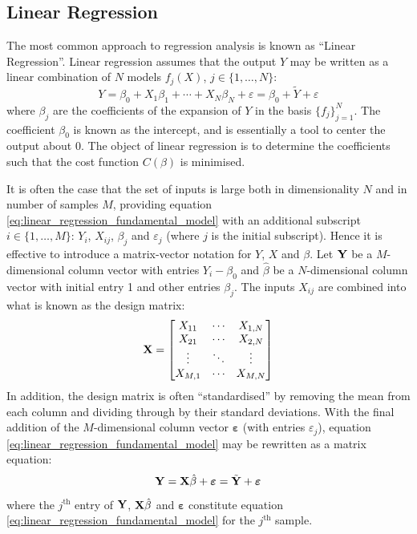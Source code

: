 \documentclass[nofootinbib,reprint,english]{revtex4-1}
\newcommand{\Y}{\vb{Y}}
\newcommand{\X}{\vb{X}}
\newcommand{\betahat}{\hat{\beta}}
\newcommand{\Eps}{\boldsymbol{\varepsilon}}
\begin{document}
\subsection{Linear Regression}
The most common approach to regression analysis is known as ``Linear Regression''. Linear regression assumes that the output \(Y\) may be written as a linear combination of \(N\) models \(f_j(X)\), \(j\in\{1,\ldots,N\}\):
\begin{equation}\label{eq:linear_regression_fundamental_model}
Y=\beta_0+X_1\beta_1+\cdots+X_N\beta_N+\varepsilon=\beta_0+\tilde{Y}+\varepsilon
\end{equation}
where \(\beta_j\) are the coefficients of the expansion of \(Y\) in the basis \(\{f_j\}_{j=1}^N\). The coefficient \(\beta_0\) is known as the intercept, and is essentially a tool to center the output about 0. The object of linear regression is to determine the coefficients such that the cost function \(C(\beta)\) is minimised.

It is often the case that the set of inputs is large both in dimensionality \(N\) and in number of samples \(M\), providing equation \eqref{eq:linear_regression_fundamental_model} with an additional subscript \(i\in\{1,\ldots,M\}\): \(Y_i\), \(X_{ij}\), \(\beta_j\) and \(\varepsilon_j\) (where \(j\) is the initial subscript).  Hence it is effective to introduce a matrix-vector notation for \(Y\), \(X\) and \(\beta\). Let \(\Y\) be a \(M\)-dimensional column vector with entries \(Y_i-\beta_0\) and \(\betahat\) be a \(N\)-dimensional column vector with initial entry 1 and other entries \(\beta_j\). The inputs \(X_{ij}\) are combined into what is known as the design matrix:
\begin{equation}
\X=\mqty[
X_{11}  & \cdots & X_{1,N} \\
X_{21}  & \cdots & X_{2,N} \\
\vdots  & \ddots & \vdots  \\
X_{M,1} & \cdots & X_{M,N} ]
\end{equation}
In addition, the design matrix is often ``standardised'' by removing the mean from each column and dividing through by their standard deviations. With the final addition of the \(M\)-dimensional column vector \(\Eps\) (with entries \(\varepsilon_j\)), equation \eqref{eq:linear_regression_fundamental_model} may be rewritten as a matrix equation:
\begin{equation}\label{eq:linear_regression_matrix_equation}
\Y=\X\betahat+\Eps=\tilde{\Y}+\Eps
\end{equation}
where the \(j^\text{th}\) entry of \(\Y\), \(\X\betahat\) and \(\Eps\) constitute equation \eqref{eq:linear_regression_fundamental_model} for the \(j^\text{th}\) sample.
\end{document}
